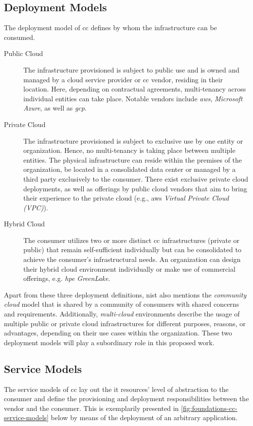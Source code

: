 		
		\subsection{Deployment Models} \label{subsec:foundations-intro_cc-deployment}
		The deployment model of \ac{cc} defines by whom the infrastructure can be consumed.
		
		\begin{description}
			\item[Public Cloud] The infrastructure provisioned is subject to public use and is owned and managed by a cloud service provider or \ac{cc} vendor, residing in their location. \cite{NISTcc} Here, depending on contractual agreements, multi-tenancy across individual entities can take place. Notable vendors include \textit{\ac{aws}}, \textit{Microsoft Azure}, as well as \textit{\ac{gcp}}.
			\item[Private Cloud] The infrastructure provisioned is subject to exclusive use by one entity or organization. Hence, no multi-tenancy is taking place between multiple entities. The physical infrastructure can reside within the premises of the organization, be located in a consolidated data center or managed by a third party exclusively to the consumer. \cite{NISTcc} There exist exclusive private cloud deployments, as well as offerings by public cloud vendors that aim to bring their experience to the private cloud (e.g., \ac{aws} \textit{Virtual Private Cloud (VPC)}).
			\item[Hybrid Cloud] The consumer utilizes two or more distinct \ac{cc} infrastructures (private or public) that remain self-sufficient individually but can be consolidated to achieve the consumer's infrastructural needs. \cite{NISTcc} An organization can design their hybrid cloud environment individually or make use of commercial offerings, e.g. \textit{\acs{hpe} GreenLake}.
		\end{description}
		
		Apart from these three deployment definitions, \ac{nist} also mentions the \textit{community cloud} model that is shared by a community of consumers with shared concerns and requirements. \cite{NISTcc}  Additionally, \textit{multi-cloud} environments describe the usage of multiple public or private cloud infrastructures for different purposes, reasons, or advantages, depending on their use cases within the organization. These two deployment models will play a subordinary role in this proposed work.

		
		\subsection{Service Models} \label{subsec:foundations-intro_cc-service}
			The service models of \ac{cc} lay out the \ac{it} resources' level of abstraction to the consumer and define the provisioning and deployment responsibilities between the vendor and the consumer. This is exemplarily presented in \autoref{fig:foundations-cc-service-models} below by means of the deployment of an arbitrary application. 
		
